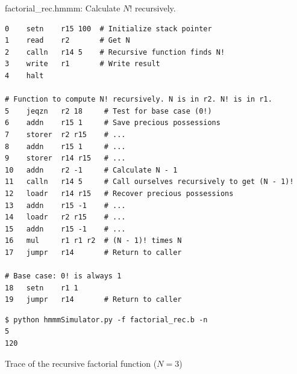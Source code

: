 \documentclass[8pt,a4paper,compress]{beamer}
\begin{document}
\begin{frame}[fragile]
\pause

\begin{framed}
\tiny factorial\_rec.hmmm: Calculate $N!$ recursively.
\end{framed}

\begin{lstlisting}[language={}]
0    setn    r15 100  # Initialize stack pointer
1    read    r2       # Get N
2    calln   r14 5    # Recursive function finds N!
3    write   r1       # Write result
4    halt

# Function to compute N! recursively. N is in r2. N! is in r1. 
5    jeqzn   r2 18     # Test for base case (0!)
6    addn    r15 1     # Save precious possessions
7    storer  r2 r15    # ...
8    addn    r15 1     # ...
9    storer  r14 r15   # ...
10   addn    r2 -1     # Calculate N - 1
11   calln   r14 5     # Call ourselves recursively to get (N - 1)!
12   loadr   r14 r15   # Recover precious possessions
13   addn    r15 -1    # ...
14   loadr   r2 r15    # ...
15   addn    r15 -1    # ...
16   mul     r1 r1 r2  # (N - 1)! times N
17   jumpr   r14       # Return to caller

# Base case: 0! is always 1
18   setn    r1 1
19   jumpr   r14       # Return to caller
\end{lstlisting}

\pause

\begin{lstlisting}[language={}]
$ python hmmmSimulator.py -f factorial_rec.b -n
5
120
\end{lstlisting}
\end{frame}

\begin{frame}[fragile]
\pause

Trace of the recursive factorial function ($N=3$)
\begin{center}
\end{center}
\end{frame}
\end{document}
